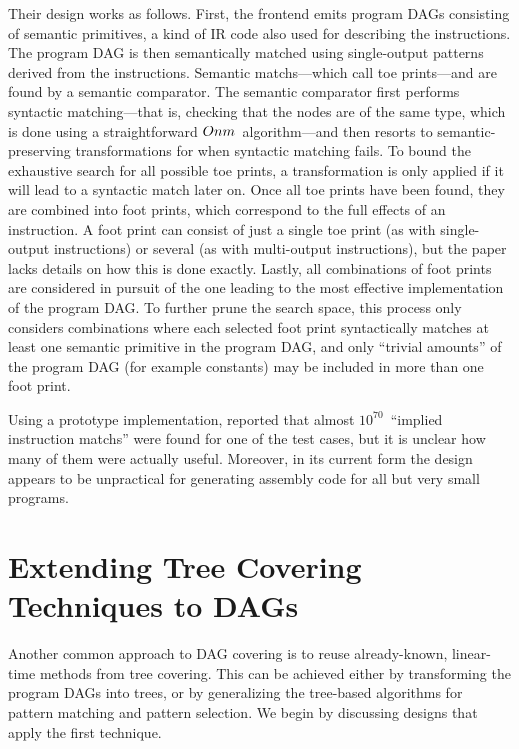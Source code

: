 Their design works as follows.
%
First, the \gls{frontend} emits \glspl{program
  DAG} consisting of \glspl{semantic primitive}, a kind of \gls{IR} code also used
for describing the \glspl{instruction}.
%
The \gls{program DAG} is then
semantically matched using single-output \glspl{pattern} derived from the
\glspl{instruction}.
%
Semantic \glspl{match}---which \citeauthor{Hoover1996}
call \glspl{toe print}---and are found by a \gls{semantic comparator}.
%
The
\gls{semantic comparator} first performs syntactic matching---that is, checking
that the \glspl{node} are of the same type, which is done using a
straightforward \mbox{$O{nm}$}~algorithm---and then resorts to
semantic-preserving transformations for when syntactic matching fails.
%
To bound
the exhaustive search for all possible \glspl{toe print}, a transformation is
only applied if it will lead to a syntactic \gls{match} later on.
%
 Once all
\glspl{toe print} have been found, they are combined into \glspl{foot print},
which correspond to the full effects of an \gls{instruction}.
%
A \gls{foot print}
can consist of just a single \gls{toe print} (as with \glspl{single-output
  instruction}) or several (as with \glspl{multi-output instruction}), but the
paper lacks details on how this is done exactly.
%
Lastly, all combinations of
\glspl{foot print} are considered in pursuit of the one leading to the most
effective implementation of the \gls{program DAG}.
%
To further prune the search
space, this process only considers combinations where each selected \gls{foot
  print} syntactically matches at least one \gls{semantic primitive} in the
\gls{program DAG}, and only ``trivial amounts'' of the \gls{program DAG} (for
example constants) may be included in more than one \gls{foot print}.

Using a prototype implementation, \citeauthor{Hoover1996} reported that almost
$10^{70}$~``implied \gls{instruction} \glspl{match}'' were found for one of the
test cases, but it is unclear how many of them were actually useful.
%
Moreover,
in its current form the design appears to be unpractical for generating
\gls{assembly code} for all but very small \glspl{program}.


\section{Extending Tree Covering Techniques to DAGs}

Another common approach to \gls{DAG covering} is to reuse already-known,
linear-time methods from \gls{tree covering}.
%
This can be achieved either by
transforming the \glspl{program DAG} into \glspl{tree}, or by generalizing the
\gls{tree}-based algorithms for \gls{pattern matching} and \gls{pattern
  selection}.
%
We begin by discussing designs that apply the first technique.


